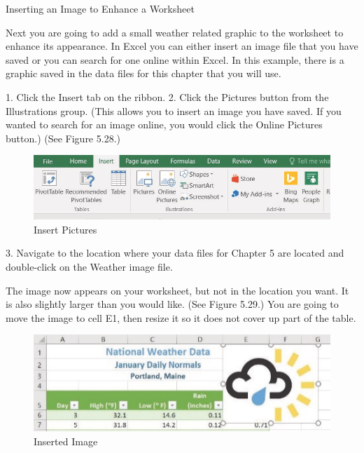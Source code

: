 Inserting an Image to Enhance a Worksheet

Next you are going to add a small weather related graphic to the worksheet to enhance its appearance.
In Excel you can either insert an image file that you have saved or you can search for one online within
Excel. In this example, there is a graphic saved in the data files for this chapter that you will use.

1. Click the Insert tab on the ribbon.
2. Click the Pictures button from the Illustrations group. (This allows you to insert an image you
have saved. If you wanted to search for an image online, you would click the Online Pictures
button.) (See Figure 5.28.)


\begin{figure}[H]
	\centering
	\includegraphics[width=\maxwidth{.95\linewidth}]{gfx/ch05_fig28}
	\caption{Insert Pictures}
	\label{05:fig28}
\end{figure}





3. Navigate to the location where your data files for Chapter 5 are located and double-click on the
Weather image file.

The image now appears on your worksheet, but not in the location you want. It is also slightly larger
than you would like. (See Figure 5.29.) You are going to move the image to cell E1, then resize it so it
does not cover up part of the table.


\begin{figure}[H]
	\centering
	\includegraphics[width=\maxwidth{.95\linewidth}]{gfx/ch05_fig29}
	\caption{Inserted Image}
	\label{05:fig29}
\end{figure}





